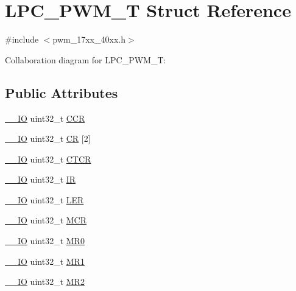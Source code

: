 \hypertarget{structLPC__PWM__T}{}\section{L\+P\+C\+\_\+\+P\+W\+M\+\_\+T Struct Reference}
\label{structLPC__PWM__T}


{\ttfamily \#include $<$pwm\+\_\+17xx\+\_\+40xx.\+h$>$}



Collaboration diagram for L\+P\+C\+\_\+\+P\+W\+M\+\_\+T\+:
\subsection*{Public Attributes}
\begin{DoxyCompactItemize}
\item 
\hyperlink{core__cm3_8h_aec43007d9998a0a0e01faede4133d6be}{\+\_\+\+\_\+\+IO} uint32\+\_\+t \hyperlink{structLPC__PWM__T_a18c9b3bd596a16bb8586637d967e7aaf}{C\+CR}
\item 
\hyperlink{core__cm3_8h_aec43007d9998a0a0e01faede4133d6be}{\+\_\+\+\_\+\+IO} uint32\+\_\+t \hyperlink{structLPC__PWM__T_aa4ea116945188624a93dae9a0bfc99ca}{CR} \mbox{[}2\mbox{]}
\item 
\hyperlink{core__cm3_8h_aec43007d9998a0a0e01faede4133d6be}{\+\_\+\+\_\+\+IO} uint32\+\_\+t \hyperlink{structLPC__PWM__T_aa04ba740491fd2bb3193b33269244992}{C\+T\+CR}
\item 
\hyperlink{core__cm3_8h_aec43007d9998a0a0e01faede4133d6be}{\+\_\+\+\_\+\+IO} uint32\+\_\+t \hyperlink{structLPC__PWM__T_a5f9b67e6edcb90f7c475f029df300abc}{IR}
\item 
\hyperlink{core__cm3_8h_aec43007d9998a0a0e01faede4133d6be}{\+\_\+\+\_\+\+IO} uint32\+\_\+t \hyperlink{structLPC__PWM__T_af29d566c4adc940d0f11e36697205ede}{L\+ER}
\item 
\hyperlink{core__cm3_8h_aec43007d9998a0a0e01faede4133d6be}{\+\_\+\+\_\+\+IO} uint32\+\_\+t \hyperlink{structLPC__PWM__T_af7658010858227b5c56d5af3da2010c5}{M\+CR}
\item 
\hyperlink{core__cm3_8h_aec43007d9998a0a0e01faede4133d6be}{\+\_\+\+\_\+\+IO} uint32\+\_\+t \hyperlink{structLPC__PWM__T_a1ca9cba93b958a8d01e402676096a833}{M\+R0}
\item 
\hyperlink{core__cm3_8h_aec43007d9998a0a0e01faede4133d6be}{\+\_\+\+\_\+\+IO} uint32\+\_\+t \hyperlink{structLPC__PWM__T_ae757c05e740e12c63e513c6fab9fffbc}{M\+R1}
\item 
\hyperlink{core__cm3_8h_aec43007d9998a0a0e01faede4133d6be}{\+\_\+\+\_\+\+IO} uint32\+\_\+t \hyperlink{structLPC__PWM__T_a455e12eec22199d07a9b87195ac74088}{M\+R2}

\end{DoxyCompactItemize}
